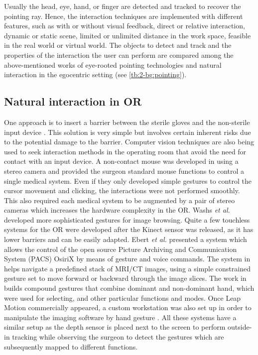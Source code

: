 Usually the head, eye, hand, or finger are detected and tracked to recover the pointing ray. Hence, the interaction techniques are implemented with different features, such as with or without visual feedback, direct or relative interaction, dynamic or static scene, limited or unlimited distance in the work space, feasible in the real world or virtual world.
The objects to detect and track and the properties of the interaction the user can perform are compared among the above-mentioned works of eye-rooted pointing technologies and natural interaction in the egocentric setting (see \tablename{ \ref{tb:2-bg:pointing}}).

\subsection{Natural interaction in OR}
One approach is to insert a barrier between the sterile gloves and the non-sterile input device \cite{Ionescu2006}. This solution is very simple but involves certain inherent risks due to the potential damage to the barrier. Computer vision techniques are also being used to seek interaction methods in the operating room that avoid the need for contact with an input device.
A non-contact mouse was developed in \cite{Gratzel2004a} using a stereo camera and provided the surgeon standard mouse functions to control a single medical system. Even if they only developed simple gestures to control the cursor movement and clicking, the interactions were not performed smoothly. This also required each medical system to be augmented by a pair of stereo cameras which increases the hardware complexity in the OR. 
Washs \textit{et al.} \cite{Wachs2008} developed more sophisticated gestures for image browsing.
Quite a few touchless systems \cite{Strickland2013,Ebert2013,Tan2013} for the OR were developed after the Kinect sensor was released, as it has lower barriers and can be easily adapted.
Ebert \textit{et al.} \cite{Ebert2013} presented a system which allows the control of the open source Picture Archiving and Communication System (PACS) OsiriX by means of gesture and voice commands.   
The system in \cite{Strickland2013} helps navigate a predefined stack of MRI/CT images, using a simple constrained gesture set to move forward or backward through the image slices. 
The work in \cite{Tan2013} builds compound gestures that combine dominant and non-dominant hand, which were used for selecting, and other particular functions and modes. 
Once Leap Motion commercially appeared, a custom workstation was also set up in order to manipulate the imaging software by hand gesture \cite{Rosa2014}. 
All these systems have a similar setup as the depth sensor is placed next to the screen to perform outside-in tracking while observing the surgeon to detect the gestures which are subsequently mapped to different functions. 

